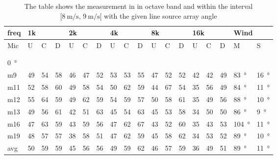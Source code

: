 \begin{table}[H]
\centering
\caption{The table shows the measurement in in octave band and within the interval $[\SI{8}{\meter\per\second},\, \SI{9}{\meter\per\second}[ $ with the given line source array angle}
\setlength\tabcolsep{5pt} %
\begin{tabular}{l|l|l|l|l|l|l|l|l|l|l|l|l|l|l|l|l|l}
freq & \multicolumn{3}{l|}{1k} & \multicolumn{3}{l|}{2k} & \multicolumn{3}{l|}{4k} & \multicolumn{3}{l|}{8k} & \multicolumn{3}{l|}{16k}   &  \multicolumn{2}{l}{Wind}                      \\ \hline
Mic  & U      & C      & D     & U      & C      & D     & U      & C      & D     & U      & C      & D     & U  & C  & D & M &S \\ \hline
 & \multicolumn{3}{l|}{} & \multicolumn{3}{l|}{} & \multicolumn{3}{l|}{} & \multicolumn{3}{l|}{} & \multicolumn{3}{l|}{} &      \multicolumn{2}{l}{}                        \\ 
 \multicolumn{18}{l}{ } \\  
\SI{0}{\degree}   & \multicolumn{3}{l|}{} & \multicolumn{3}{l|}{} & \multicolumn{3}{l|}{} & \multicolumn{3}{l|}{} & \multicolumn{3}{l|}{} & \multicolumn{2}{l}{}   \\  \hline
m9   & 49     & 54     & 58    & 46     & 47     & 52    & 53     & 53     & 55    & 47     & 52     & 52    & 42 & 42 & 49  & \SI{83}{\degree} & \SI{16}{\degree}  \\
m11  & 52     & 58     & 60    & 49     & 58     & 54    & 50     & 62     & 59    & 44     & 67     & 54    & 35 & 56 & 49   & \SI{84}{\degree} & \SI{11}{\degree}  \\
m12  & 55     & 64     & 59    & 49     & 62     & 59    & 54     & 59     & 57    & 50     & 58     & 61    & 35 & 49 & 56   & \SI{88}{\degree} & \SI{10}{\degree}  \\
m13  & 49     & 56     & 61    & 42     & 51     & 63    & 45     & 54     & 63    & 45     & 53     & 58    & 34 & 50 & 50   & \SI{86}{\degree} & \SI{9}{\degree}  \\
m16  & 47     & 63     & 59    & 43     & 59     & 56    & 47     & 62     & 67    & 43     & 52     & 60    & 35 & 43 & 53   & \SI{104}{\degree} & \SI{11}{\degree}  \\
m19  & 48     & 57     & 57    & 38     & 58     & 51    & 47     & 62     & 59    & 45     & 58     & 62    & 34 & 53 & 52   & \SI{89}{\degree} & \SI{10}{\degree}  \\ \hline
avg  &  50    &  59    & 59    &  45     &  56    &  56   & 49     & 59     & 62    & 46     & 57     & 59    & 36   & 49   & 51   & \SI{89}{\degree} & \SI{11}{\degree}  \\ \hline  

\end{tabular}
\end{table}

